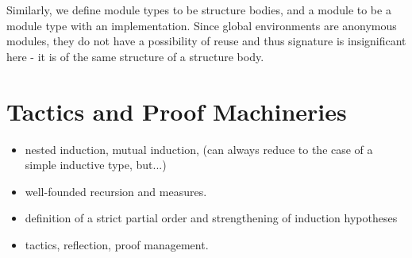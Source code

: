 
Similarly, we define module types to be structure bodies, and a module to be a
module type with an implementation. Since global environments are anonymous
modules, they do not have a possibility of reuse and thus signature is
insignificant here - it is of the same structure of a structure body.




\section{Tactics and Proof Machineries}
\begin{itemize}
  \item nested induction, mutual induction, (can always reduce to the case of a
  simple inductive type, but...)
  \item well-founded recursion and measures.
  \item definition of a strict partial order and strengthening of induction
  hypotheses 
  \item tactics, reflection, proof management.
\end{itemize}